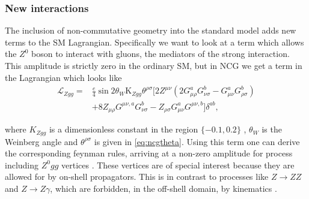 \subsubsection{New interactions}
The inclusion of non-commutative geometry into the standard model adds new terms to the SM Lagrangian. Specifically we want to look at a term which allows the $Z^0$ boson to interact with gluons, the mediators of the strong interaction. This amplitude is strictly zero in the ordinary SM, but in NCG we get a term in the Lagrangian which looks like \cite{melic2005smn}
\begin{align} \label{eq:zggterm}
	\mathcal{L}_{Zgg} = &\frac{e}{4}\sin{2\theta_W}\textrm{K}_{Zgg}\theta^{\rho\sigma}
	[2 Z^{\mu\nu} (2 G_{\mu\rho}^a G_{\nu\sigma}^b - G_{\mu\nu}^a G_{\rho\sigma}^b) \nonumber \\
	 &+ 8 Z_{\mu\rho} G^{\mu\nu,a} G_{\nu\sigma}^b - Z_{\rho\sigma} G_{\mu\nu}^a G^{\mu\nu,b}
	] \delta^{ab},
\end{align}

where $K_{Zgg}$ is a dimensionless constant in the region $\{-0.1,0.2\}$ \cite{behr2003dnc}, $\theta_W$ is the Weinberg angle and $\theta^{\rho\sigma}$ is given in \eqref{eq:ncgtheta}. Using this term one can derive the corresponding feynman rules, arriving at a non-zero amplitude for process including $Z^0gg$ vertices \cite{melic2005smn}. These vertices are of special interest because they are allowed for by on-shell propagators. This is in contrast to processes like $Z \rightarrow ZZ$ and $Z \rightarrow Z\gamma$, which are forbidden, in the off-shell domain, by kinematics \cite{behr2003dnc}.